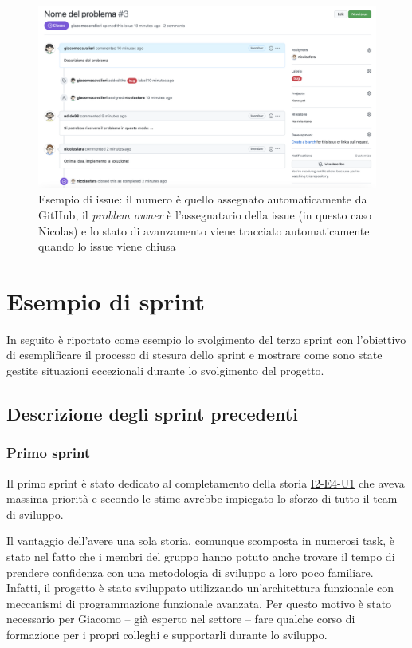 \begin{figure}[htp]
  \centering
  \includegraphics[width=\textwidth]{images/issue-example.png}
  \caption{Esempio di issue: il numero è quello assegnato automaticamente da GitHub, il \emph{problem owner} è l'assegnatario della issue (in questo caso Nicolas) e lo stato di avanzamento viene tracciato automaticamente quando lo issue viene chiusa}
  \label{fig:issue-log}
\end{figure}

\section{Esempio di sprint}
In seguito è riportato come esempio lo svolgimento del terzo sprint con l'obiettivo di esemplificare il processo di stesura dello sprint e mostrare come sono state gestite situazioni eccezionali durante lo svolgimento del progetto.

\subsection{Descrizione degli sprint precedenti}
\subsubsection{Primo sprint}
Il primo sprint è stato dedicato al completamento della storia \hyperref[user-story:i2-e4-u1]{I2-E4-U1} che aveva massima priorità e secondo le stime avrebbe impiegato lo sforzo di tutto il team di sviluppo.

Il vantaggio dell'avere una sola storia, comunque scomposta in numerosi task, è stato nel fatto che i membri del gruppo hanno potuto anche trovare il tempo di prendere confidenza con una metodologia di sviluppo a loro poco familiare. Infatti, il progetto è stato sviluppato utilizzando un'architettura funzionale con meccanismi di programmazione funzionale avanzata.
Per questo motivo è stato necessario per Giacomo -- già esperto nel settore -- fare qualche corso di formazione per i propri colleghi e supportarli durante lo sviluppo.

